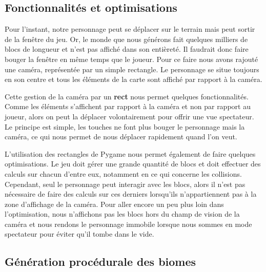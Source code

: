 \documentclass[12pt]{article}
\begin{document}
\subsection{Fonctionnalités et optimisations}

Pour l'instant, notre personnage peut se déplacer sur le terrain mais peut sortir de la fenêtre du jeu. Or, le monde que nous générons fait quelques milliers de blocs de longueur et n'est pas affiché dans son entièreté. Il faudrait donc faire bouger la fenêtre en même temps que le joueur. Pour ce faire nous avons rajouté une caméra, représentée par un simple rectangle. Le personnage se situe toujours en son centre et tous les éléments de la carte sont affiché par rapport à la caméra.\par
\vspace{1cm}
Cette gestion de la caméra par un \textbf{rect} nous permet quelques fonctionnalités. Comme les éléments s'affichent par rapport à la caméra et non par rapport au joueur, alors on peut la déplacer volontairement pour offrir une vue spectateur. Le principe est simple, les touches ne font plus bouger le personnage mais la caméra, ce qui nous permet de nous déplacer rapidement quand l'on veut.\par 
L'utilisation des rectangles de Pygame nous permet également de faire quelques optimisations. Le jeu doit gérer une grande quantité de blocs et doit effectuer des calculs sur chacun d'entre eux, notamment en ce qui concerne les collisions. Cependant, seul le personnage peut interagir avec les blocs, alors il n'est pas nécessaire de faire des calculs sur ces derniers lorsqu'ils n'appartiennent pas à la zone d'affichage de la caméra. Pour aller encore un peu plus loin dans l'optimisation, nous n'affichons pas les blocs hors du champ de vision de la caméra et nous rendons le personnage immobile lorsque nous sommes en mode spectateur pour éviter qu'il tombe dans le vide.
\vspace{1cm}
\subsection{Génération procédurale des biomes}
\end{document}
